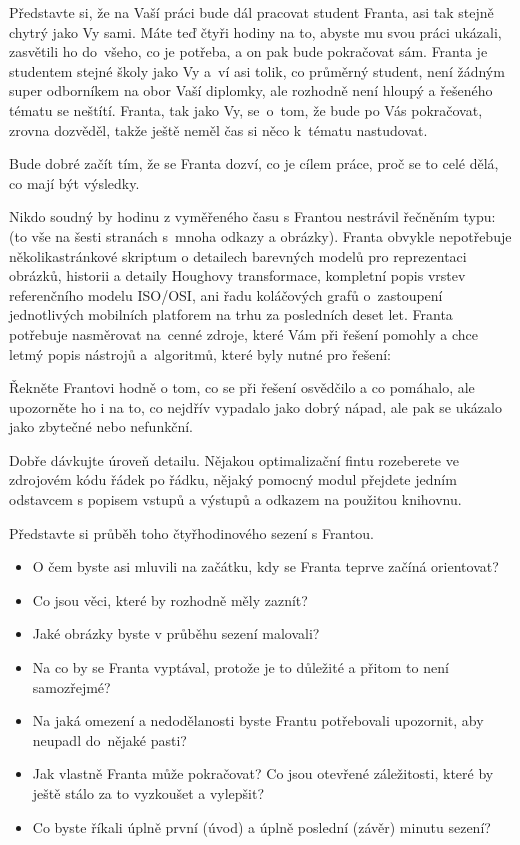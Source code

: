Představte si, že na Vaší práci bude dál pracovat student Franta, asi tak stejně chytrý jako Vy sami. Máte teď čtyři hodiny na to, abyste mu svou práci ukázali, zasvětili ho do~všeho, co je potřeba, a on pak bude pokračovat sám. Franta je studentem stejné školy jako Vy a~ví asi tolik, co průměrný student, není žádným super odborníkem na obor Vaší diplomky, ale rozhodně není hloupý a řešeného tématu se neštítí. Franta, tak jako Vy, se~o~tom, že bude po Vás pokračovat, zrovna dozvěděl, takže ještě neměl čas si něco k~tématu nastudovat.

Bude dobré začít tím, že se Franta dozví, co je cílem práce, proč se to celé dělá, co mají být výsledky.

Nikdo soudný by hodinu z vyměřeného času s Frantou nestrávil řečněním typu:  (to vše na šesti stranách s~mnoha odkazy a obrázky).
Franta obvykle nepotřebuje několikastránkové skriptum o detailech barevných modelů pro reprezentaci obrázků, historii a detaily Houghovy transformace, kompletní popis vrstev referenčního modelu ISO/OSI, ani řadu koláčových grafů o~zastoupení jednotlivých mobilních platforem na trhu za posledních deset let.
Franta potřebuje nasměrovat na~cenné zdroje, které Vám při řešení pomohly a chce letmý popis nástrojů a~algoritmů, které byly nutné pro řešení: 

Řekněte Frantovi hodně o tom, co se při řešení osvědčilo a co pomáhalo, ale upozorněte ho i na to, co nejdřív vypadalo jako dobrý nápad, ale pak se ukázalo jako zbytečné nebo nefunkční.

Dobře dávkujte úroveň detailu. Nějakou optimalizační fintu rozeberete ve zdrojovém kódu řádek po řádku, nějaký pomocný modul přejdete jedním odstavcem s popisem vstupů a výstupů a odkazem na použitou knihovnu.

Představte si průběh toho čtyřhodinového sezení s Frantou.
\begin{itemize}
  \item{O čem byste asi mluvili na začátku, kdy se Franta teprve začíná orientovat?}
  \item{Co jsou věci, které by rozhodně měly zaznít?}
  \item{Jaké obrázky byste v průběhu sezení malovali?}
  \item{Na co by se Franta vyptával, protože je to důležité a přitom to není samozřejmé?}
  \item{Na jaká omezení a nedodělanosti byste Frantu potřebovali upozornit, aby neupadl do~nějaké pasti?}
  \item{Jak vlastně Franta může pokračovat? Co jsou otevřené záležitosti, které by ještě stálo za to vyzkoušet a vylepšit?}
  \item{Co byste říkali úplně první (úvod) a úplně poslední (závěr) minutu sezení?}
\end{itemize}



